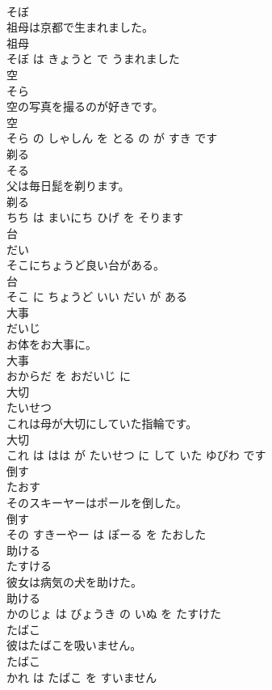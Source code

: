 \documentclass[8pt]{extreport}
\begin{document}
\begin{CJK}{UTF8}{min}
\\	そぼ			
\\	祖母は京都で生まれました。	
\\	祖母 
\\	そぼ は きょうと で うまれました			
\\	空	
\\	そら			
\\	空の写真を撮るのが好きです。	
\\	空 
\\	そら の しゃしん を とる の が すき です			
\\	剃る	
\\	そる			
\\	父は毎日髭を剃ります。	
\\	剃る 
\\	ちち は まいにち ひげ を そります			
\\	台	
\\	だい			
\\	そこにちょうど良い台がある。	
\\	台 
\\	そこ に ちょうど いい だい が ある			
\\	大事	
\\	だいじ			
\\	お体をお大事に。	
\\	大事 
\\	おからだ を おだいじ に			
\\	大切	
\\	たいせつ			
\\	これは母が大切にしていた指輪です。	
\\	大切 
\\	これ は はは が たいせつ に して いた ゆびわ です			
\\	倒す	
\\	たおす			
\\	そのスキーヤーはポールを倒した。	
\\	倒す 
\\	その すきーやー は ぽーる を たおした			
\\	助ける	
\\	たすける			
\\	彼女は病気の犬を助けた。	
\\	助ける 
\\	かのじょ は びょうき の いぬ を たすけた			
\\	たばこ	
\\	彼はたばこを吸いません。	
\\	たばこ 
\\	かれ は たばこ を すいません			

\end{CJK}
\end{document}
